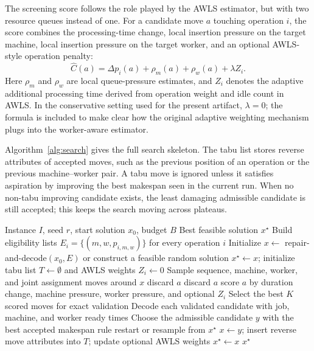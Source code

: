 \documentclass[sigconf,anonymous,review,dvipsnames]{acmart}
\begin{document}
The screening score follows the role played by the AWLS estimator, but with two resource queues instead of one.
For a candidate move $a$ touching operation $i$, the score combines the processing-time change, local insertion pressure on the target machine, local insertion pressure on the target worker, and an optional AWLS-style operation penalty:
\[
  \hat{C}(a) = \Delta p_i(a) + \rho_m(a) + \rho_w(a) + \lambda Z_i .
\]
Here $\rho_m$ and $\rho_w$ are local queue-pressure estimates, and $Z_i$ denotes the adaptive additional processing time derived from operation weight and idle count in AWLS.
In the conservative setting used for the present artifact, $\lambda=0$; the formula is included to make clear how the original adaptive weighting mechanism plugs into the worker-aware estimator.

Algorithm~\ref{alg:search} gives the full search skeleton.
The tabu list stores reverse attributes of accepted moves, such as the previous position of an operation or the previous machine--worker pair.
A tabu move is ignored unless it satisfies aspiration by improving the best makespan seen in the current run.
When no non-tabu improving candidate exists, the least damaging admissible candidate is still accepted; this keeps the search moving across plateaus.

\begin{algorithm}[t]
  \caption{Worker-aware warm-started tabu search}
  \label{alg:search}
  \begin{algorithmic}[1]
    \Require Instance $I$, seed $r$, start solution $x_0$, budget $B$
    \Ensure Best feasible solution $x^\star$
    \State Build eligibility lists $E_i=\{(m,w,p_{i,m,w})\}$ for every operation $i$
    \State Initialize $x \gets$ repair-and-decode$(x_0,E)$ or construct a feasible random solution
    \State $x^\star \gets x$; initialize tabu list $T \gets \emptyset$ and AWLS weights $Z_i \gets 0$
      \State Sample sequence, machine, worker, and joint assignment moves around $x$
          \State discard $a$
          \State discard $a$
        \Else
          \State score $a$ by duration change, machine pressure, worker pressure, and optional $Z_i$
        \EndIf
      \EndFor
      \State Select the best $K$ scored moves for exact validation
      \State Decode each validated candidate with job, machine, and worker ready times
      \State Choose the admissible candidate $y$ with the best accepted makespan rule
        \State restart or resample from $x^\star$
      \Else
        \State $x \gets y$; insert reverse move attributes into $T$; update optional AWLS weights
          \State $x^\star \gets x$
        \EndIf
      \EndIf
    \EndWhile
    \State \Return $x^\star$
  \end{algorithmic}
\end{algorithm}
\end{document}
